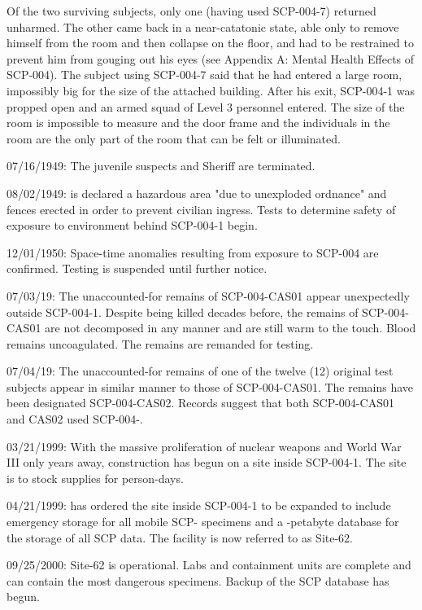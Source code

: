 \documentclass[a4paper, 11pt]{article}
\begin{document}
Of the two surviving subjects, only one (having used SCP-004-7) returned unharmed. The other came back in a near-catatonic state, able only to remove himself from the room and then collapse on the floor, and had to be restrained to prevent him from gouging out his eyes (see Appendix A: Mental Health Effects of SCP-004). The subject using SCP-004-7 said that he had entered a large room, impossibly big for the size of the attached building. After his exit, SCP-004-1 was propped open and an armed squad of Level 3 personnel entered. The size of the room is impossible to measure and the door frame and the individuals in the room are the only part of the room that can be felt or illuminated.

07/16/1949: The juvenile suspects and Sheriff   are terminated.

08/02/1949:  is declared a hazardous area "due to unexploded ordnance" and fences erected in order to prevent civilian ingress. Tests to determine safety of exposure to environment behind SCP-004-1 begin.

12/01/1950: Space-time anomalies resulting from exposure to SCP-004 are confirmed. Testing is suspended until further notice.

07/03/19: The unaccounted-for remains of SCP-004-CAS01 appear unexpectedly outside SCP-004-1. Despite being killed decades before, the remains of SCP-004-CAS01 are not decomposed in any manner and are still warm to the touch. Blood remains uncoagulated. The remains are remanded for testing.

07/04/19: The unaccounted-for remains of one of the twelve (12) original test subjects appear in similar manner to those of SCP-004-CAS01. The remains have been designated SCP-004-CAS02. Records suggest that both SCP-004-CAS01 and CAS02 used SCP-004-.

03/21/1999: With the massive proliferation of nuclear weapons and World War III only  years away, construction has begun on a site inside SCP-004-1. The site is to stock supplies for  person-days.

04/21/1999:  has ordered the site inside SCP-004-1 to be expanded to include emergency storage for all mobile SCP- specimens and a -petabyte database for the storage of all SCP data. The facility is now referred to as Site-62.

09/25/2000: Site-62 is operational. Labs and containment units are complete and can contain the most dangerous specimens. Backup of the SCP database has begun.
\end{document}
